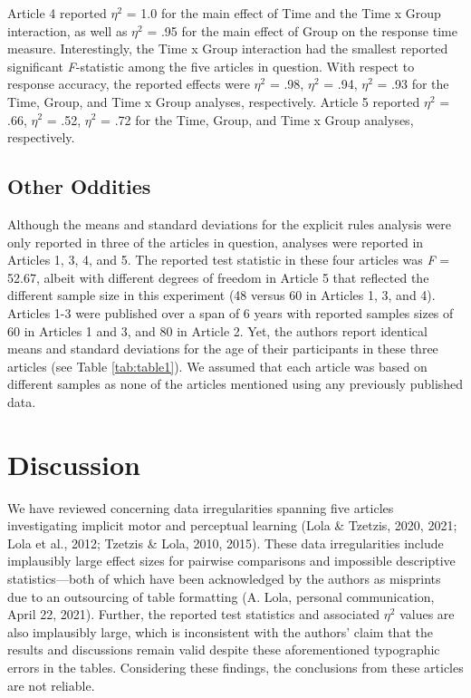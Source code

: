 \documentclass[
  english,
  man, donotrepeattitle,floatsintext]{apa7}
\begin{document}
Article 4 reported \(\eta^{2}\) = 1.0 for the main effect of Time and the Time x Group interaction, as well as \(\eta^{2}\) = .95 for the main effect of Group on the response time measure. Interestingly, the Time x Group interaction had the smallest reported significant \emph{F}-statistic among the five articles in question. With respect to response accuracy, the reported effects were \(\eta^{2}\) = .98, \(\eta^{2}\) = .94, \(\eta^{2}\) = .93 for the Time, Group, and Time x Group analyses, respectively. Article 5 reported \(\eta^{2}\) = .66, \(\eta^{2}\) = .52, \(\eta^{2}\) = .72 for the Time, Group, and Time x Group analyses, respectively.

\hypertarget{other-oddities}{%
\subsection{Other Oddities}\label{other-oddities}}

Although the means and standard deviations for the explicit rules analysis were only reported in three of the articles in question, analyses were reported in Articles 1, 3, 4, and 5. The reported test statistic in these four articles was \emph{F} = 52.67, albeit with different degrees of freedom in Article 5 that reflected the different sample size in this experiment (48 versus 60 in Articles 1, 3, and 4). Articles 1-3 were published over a span of 6 years with reported samples sizes of 60 in Articles 1 and 3, and 80 in Article 2. Yet, the authors report identical means and standard deviations for the age of their participants in these three articles (see Table \ref{tab:table1}). We assumed that each article was based on different samples as none of the articles mentioned using any previously published data.

\hypertarget{discussion}{%
\section{Discussion}\label{discussion}}

We have reviewed concerning data irregularities spanning five articles investigating implicit motor and perceptual learning (Lola \& Tzetzis, 2020, 2021; Lola et al., 2012; Tzetzis \& Lola, 2010, 2015). These data irregularities include implausibly large effect sizes for pairwise comparisons and impossible descriptive statistics---both of which have been acknowledged by the authors as misprints due to an outsourcing of table formatting (A. Lola, personal communication, April 22, 2021). Further, the reported test statistics and associated \(\eta^{2}\) values are also implausibly large, which is inconsistent with the authors' claim that the results and discussions remain valid despite these aforementioned typographic errors in the tables. Considering these findings, the conclusions from these articles are not reliable.
\end{document}
